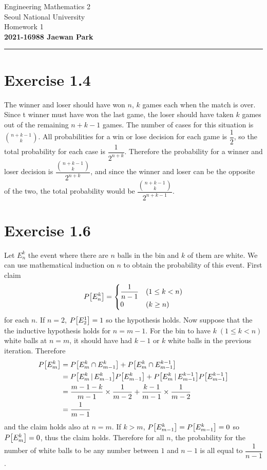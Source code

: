 \documentclass{article}
\begin{document}
\vspace*{-1.5cm}
{\centering \vbox{%
\vspace{2mm}
\large
Engineering Mathematics 2 \hfill
\\
Seoul National University
\\[4mm]
Homework 1\\
\textbf{2021-16988 Jaewan Park} \\[0.8mm]
}}
\par\noindent\rule{\textwidth}{0.5pt}

\section*{Exercise 1.4}
The winner and loser should have won $n$, $k$ games each when the match is over.
Since t winner must have won the last game, the loser should have taken $k$ games out of the remaining $n+k-1$ games.
The number of cases for this situation is ${n+k-1 \choose k}$.
All probabilities for a win or lose decision for each game is $\dfrac{1}{2}$, so the total probability for each case is $\dfrac{1}{2^{n+k}}$.
Therefore the probability for a winner and loser decision is $\dfrac{{n+k-1 \choose k}}{2^{n+k}}$, and since the winner and loser can be the opposite of the two, the total probability would be $\dfrac{{n+k-1 \choose k}}{2^{n+k-1}}$.

\section*{Exercise 1.6}
Let $E_{n}^{k}$ the event where there are $n$ balls in the bin and $k$ of them are white.
We can use mathematical induction on $n$ to obtain the probability of this event.
First claim 
$$P\qty[E_{n}^{k}] = \begin{cases}
  \dfrac{1}{n-1} & (1 \leq k < n) \\
  0 & (k \geq n)
\end{cases}$$
for each $n$.
If $n=2$, $P\qty[E_2^1] = 1$ so the hypothesis holds.
Now suppose that the the inductive hypothesis holds for $n=m-1$. 
For the bin to have $k \; (1 \leq k < n)$ white balls at $n=m$, it should have had $k-1$ or $k$ white balls in the previous iteration.
Therefore
\begin{align*}
  P\qty[E_{m}^{k}] &= P\qty[E_{m}^{k} \cap E_{m-1}^{k}] + P\qty[E_{m}^{k} \cap E_{m-1}^{k-1}] \\
  &= P\qty[E_{m}^{k} \,|\, E_{m-1}^{k}]P\qty[E_{m-1}^{k}] + P\qty[E_{m}^{k} \,|\, E_{m-1}^{k-1}]P\qty[E_{m-1}^{k-1}] \\
  &= \frac{m-1-k}{m-1} \times \frac{1}{m-2} + \frac{k-1}{m-1} \times \frac{1}{m-2} \\
  &= \frac{1}{m-1}
\end{align*}
and the claim holds also at $n=m$.
If $k > m$, $P\qty[E_{m-1}^{k}] = P\qty[E_{m-1}^{k}] = 0$ so $P\qty[E_{m}^{k}] = 0$, thus the claim holds.
Therefore for all $n$, the probability for the number of white balls to be any number between $1$ and $n-1$ is all equal to $\dfrac{1}{n-1}$.
\end{document}
